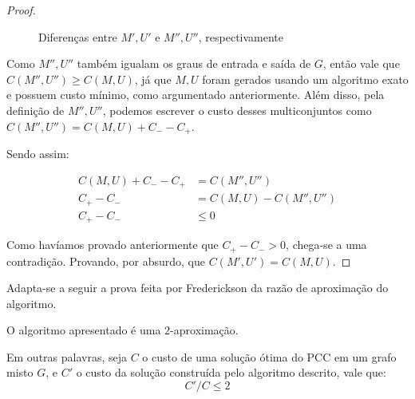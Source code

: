 \begin{proof}
\begin{figure}[H]
\begin{minipage}{.5\textwidth}
            \end{minipage}%
            \caption{Diferenças entre $M', U'$ e $M'', U''$, respectivamente}
            \label{fig:mixed-ex-lema}
        \end{figure}

        Como $M'', U''$ também igualam os graus de entrada e saída de $G$, então vale que $C(M'', U'') \geq C(M, U)$, já que $M, U$ foram gerados usando um algoritmo exato e possuem custo mínimo, como argumentado anteriormente.
        Além disso, pela definição de $M'', U''$, podemos escrever o custo desses multiconjuntos como $C(M'', U'') = C(M, U) + C_- - C_+$.
        
        Sendo assim:

        \begin{align*}
            C(M, U) + C_- - C_+ &= C(M'', U'') \\
            C_+ - C_- &= C(M, U) - C(M'', U'') \\
            C_+ - C_- &\leq 0 
        \end{align*}

        Como havíamos provado anteriormente que $C_+ - C_- > 0$, chega-se a uma contradição.
        Provando, por absurdo, que $C(M', U') = C(M, U)$.
    \end{proof}

    Adapta-se a seguir a prova feita por Frederickson \cite{frederickson} da razão de aproximação do algoritmo.

    \begin{theorem}
        O algoritmo apresentado é uma $2$-aproximação.

        Em outras palavras, seja $C$ o custo de uma solução ótima do PCC em um grafo misto $G$, e $C'$ o custo da solução construída pelo algoritmo descrito, vale que:
        \[
            C'/C \leq 2
        \]
    \end{theorem}

